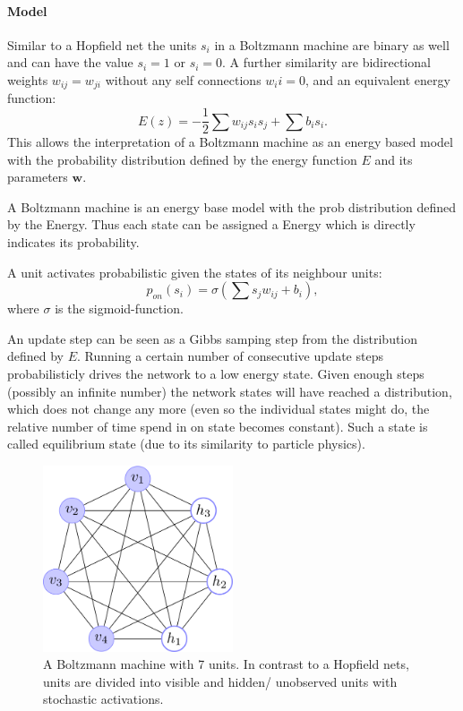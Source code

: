 \paragraph{Model}

Similar to a Hopfield net the units $s_i$ in a Boltzmann machine are binary as well and can have the value $s_i = 1$ or $s_i = 0$. 
A further similarity are bidirectional weights $w_{ij} = w_{ji} $ without any self connections $w_ii = 0$, and an equivalent energy function:
\[
	E(z) = - \frac{1}{2} \sum w_{ij} s_i s_j + \sum b_i s_i .
\]
This allows the interpretation of a Boltzmann machine as an energy based model with the probability distribution defined by the energy function $E$ and its parameters $\textbf{w}$.

A Boltzmann machine is an energy base model with the prob distribution defined by the Energy.
Thus each state can be assigned a Energy which is directly indicates its probability.

A unit activates probabilistic given the states of its neighbour units:
\[
p_{on}(s_i) = \sigma( \sum s_j w_{ij} + b_i ), 
\]
where $\sigma$ is the sigmoid-function.

An update step can be seen as a Gibbs samping step from the distribution defined by $E$.
Running a certain number of consecutive update steps probabilisticly drives the network to a low energy state. 
Given enough steps (possibly an infinite number) the network states will have reached a distribution, which does not change any more (even so the individual states might do, the relative number of time spend in on state becomes constant).
Such a state is called equilibrium state (due to its similarity to particle physics).


\begin{figure}
	\centering
    	\includegraphics[width=0.5\textwidth]{imgs/bm.png} 
    \caption{A Boltzmann machine with 7 units. In contrast to a Hopfield nets, units are divided into visible and hidden/ unobserved units with stochastic activations.}
	\label{fig:bm}
\end{figure}


